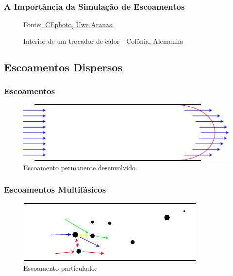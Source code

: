 \documentclass{beamer}
\newcommand{\figcopyright}[4]
{
  \begin{figure}
    \stackunder{
      \texttt{[image: \#1]}
    } {\raggedleft \tiny Fonte:\href{#2}{\textcopyright \ #3.}}
    \caption{#4}
  \end{figure}
}
\begin{document}
\begin{frame}
  \frametitle{A Importância da Simulação de Escoamentos}
  \figcopyright{figure/Cologne_Germany_Bundle-extractor-01.jpg}
	       {https://commons.wikimedia.org/wiki/File:Cologne_Germany_Bundle-extractor-01.jpg}
	       {CEphoto, Uwe Aranas}
	       {Interior de um trocador de calor - Colônia, Alemanha}
\end{frame}

\subsection{Escoamentos Dispersos}
\begin{frame}
  \frametitle{Escoamentos}
  \begin{figure}
    \includegraphics[width=\linewidth]{figure/developed_flow.pdf}
    \caption{Escoamento permanente desenvolvido.}
  \end{figure}
\end{frame}

\begin{frame}
  \frametitle{Escoamentos Multifásicos}
  \begin{figure}
    \includegraphics[width=\linewidth]{figure/particle_flow.pdf}
    \caption{Escoamento particulado.}
  \end{figure}
\end{frame}

\end{document}
